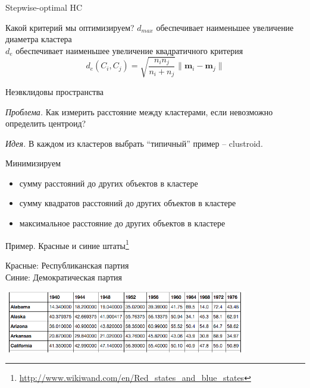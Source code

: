 \documentclass[aspectratio=169]{beamer}
\begin{document}
\begin{frame}{Stepwise-optimal HC}

Какой критерий мы оптимизируем?
\swo
$d_{max}$ обеспечивает наименьшее увеличение диаметра кластера \\
$d_e$ обеспечивает наименьшее увеличение квадратичного критерия
\[
d_e(C_i, C_j) = \sqrt{\frac{n_i n_j}{n_i + n_j}} \|\mathbf{m}_i -\mathbf{m}_j \|
\]

\end{frame}

\begin{frame}{Неэвклидовы пространства}

{\it Проблема. } Как измерить расстояние между кластерами, если невозможно определить центроид?

\vspace{1em}
{\it Идея. } В каждом из кластеров выбрать ``типичный'' пример -- clustroid.

\vspace{1em}
Минимизируем
\begin{itemize}
\item сумму расстояний до других объектов в кластере
\item сумму квадратов расстояний до других объектов в кластере
\item максимальное расстояние до других объектов в кластере
\end{itemize}

\end{frame}

\begin{frame}{Пример. Красные и синие штаты\footnote{\url{http://www.wikiwand.com/en/Red_states_and_blue_states}}}

{\color{red} Красные}: Республиканская партия \\
{\color{blue} Синие}: Демократическая партия

\begin{center}
\includegraphics[width=0.8\textwidth]{images/votes.png}
\end{center}

\end{frame}
\end{document}
